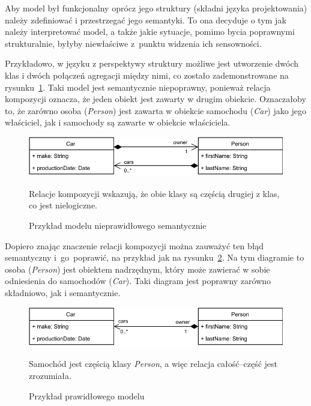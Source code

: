 Aby model był funkcjonalny oprócz jego struktury (składni języka projektowania)
należy zdefiniować i przestrzegać jego semantyki. To ona decyduje o tym jak
należy interpretować model, a także jakie sytuacje, pomimo bycia poprawnymi
strukturalnie, byłyby niewłaściwe z~punktu widzenia ich sensowności.

Przykładowo, w języku  z perspektywy struktury możliwe jest
utworzenie dwóch klas i dwóch połączeń agregacji między nimi, co zostało
zademonstrowane na rysunku~\ref{rys:nieprawidlowy-model-uml}. Taki model jest
semantycznie niepoprawny, ponieważ relacja kompozycji oznacza, że jeden obiekt
jest zawarty w drugim obiekcie. Oznaczałoby to, że zarówno osoba
(\emph{Person}) jest zawarta w obiekcie samochodu (\emph{Car}) jako jego
właściciel, jak i samochody są zawarte w obiekcie właściciela.

\begin{figure}[!hb]
	\centering

	\includegraphics[width=0.95\linewidth]{./images/invalid-uml-example.pdf}
	\caption{Przykład modelu  nieprawidłowego
		semantycznie}\label{rys:nieprawidlowy-model-uml}
	\medskip
	{\small Relacje kompozycji wskazują, że obie klasy są częścią drugiej z
		klas, co jest nielogiczne.}
\end{figure}

Dopiero znając znaczenie relacji kompozycji można zauważyć ten błąd semantyczny
i~go~poprawić, na przykład jak na rysunku~\ref{rys:prawidlowy-model-uml}. Na
tym diagramie to osoba (\emph{Person}) jest obiektem nadrzędnym, który może
zawierać w sobie odniesienia do samochodów (\emph{Car}). Taki diagram jest
poprawny zarówno składniowo, jak i semantycznie.

\begin{figure}[!hb]
	\centering

	\includegraphics[width=0.95\linewidth]{./images/valid-uml-example.pdf}
	\caption{Przykład prawidłowego modelu
		}\label{rys:prawidlowy-model-uml}
	\medskip
	{\small Samochód jest częścią klasy \emph{Person}, a więc relacja
		całość--część jest zrozumiała.}
\end{figure}

